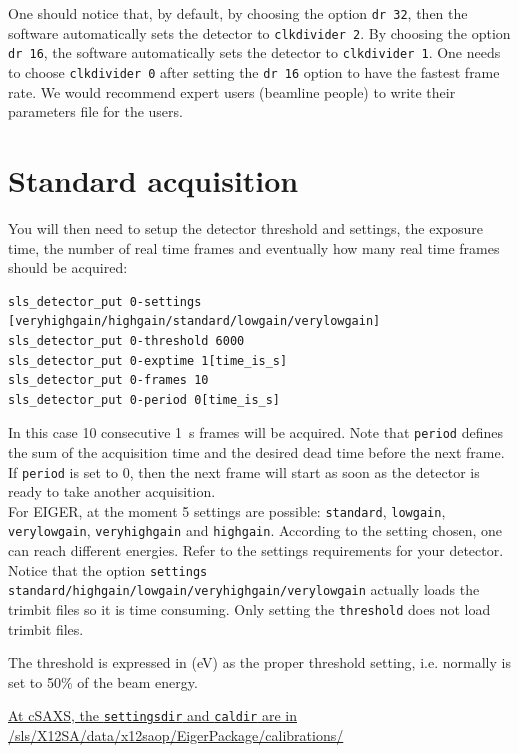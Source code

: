 \documentclass{article}
\newcommand{\E}{EIGER\xspace}
\begin{document}
One should notice that, by default, by choosing the option {\tt{dr 32}}, then the software automatically sets the detector to  {\tt{clkdivider 2}}. By choosing the option {\tt{dr 16}}, the software automatically sets the detector to  {\tt{clkdivider 1}}. One needs to choose {\tt{clkdivider 0}} after setting the {\tt{dr 16}} option to have the fastest frame rate. 
We would recommend expert users (beamline people) to write their parameters file for the users. 

\section{Standard acquisition}

You will then need to setup the detector threshold and settings, the exposure time, the number of real time frames and eventually how many real time frames should be acquired:
\begin{verbatim}
sls_detector_put 0-settings [veryhighgain/highgain/standard/lowgain/verylowgain]
sls_detector_put 0-threshold 6000
sls_detector_put 0-exptime 1[time_is_s]
sls_detector_put 0-frames 10
sls_detector_put 0-period 0[time_is_s]
\end{verbatim}
In this case 10 consecutive 1~s frames will be acquired. Note that {\tt{period}} defines the sum of the acquisition time and the desired dead time before the next frame. If {\tt{period}} is set to 0, then the next frame will start as soon as the detector is ready to take another acquisition. \\

For \E, at the moment 5 settings are possible: {\tt{standard}}, {\tt{lowgain}}, {\tt{verylowgain}}, {\tt{veryhighgain}} and {\tt{highgain}}. According to the setting chosen, one can reach different energies. Refer to the settings requirements for your detector.\\ 
Notice that the option {\tt{settings standard/highgain/lowgain/veryhighgain/verylowgain}} actually loads the trimbit files so it is time consuming. Only setting the {\tt{threshold}} does not load trimbit files.  

The threshold is expressed in (eV) as the proper threshold setting, i.e. normally is set to 50\% of the beam energy.  

\underline{At cSAXS, the {\tt{settingsdir}} and {\tt{caldir}} are in}\\\underline{/sls/X12SA/data/x12saop/EigerPackage/calibrations/}\\ 
\end{document}
